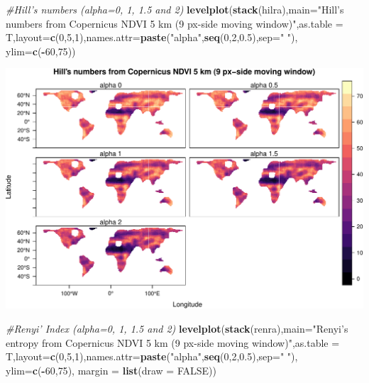 \documentclass[
]{article}
\newenvironment{Shaded}{\begin{snugshade}}{\end{snugshade}}
\newcommand{\CommentTok}[1]{\textcolor[rgb]{0.56,0.35,0.01}{\textit{#1}}}
\newcommand{\DataTypeTok}[1]{\textcolor[rgb]{0.13,0.29,0.53}{#1}}
\newcommand{\DecValTok}[1]{\textcolor[rgb]{0.00,0.00,0.81}{#1}}
\newcommand{\FloatTok}[1]{\textcolor[rgb]{0.00,0.00,0.81}{#1}}
\newcommand{\KeywordTok}[1]{\textcolor[rgb]{0.13,0.29,0.53}{\textbf{#1}}}
\newcommand{\NormalTok}[1]{#1}
\newcommand{\OperatorTok}[1]{\textcolor[rgb]{0.81,0.36,0.00}{\textbf{#1}}}
\newcommand{\OtherTok}[1]{\textcolor[rgb]{0.56,0.35,0.01}{#1}}
\newcommand{\StringTok}[1]{\textcolor[rgb]{0.31,0.60,0.02}{#1}}
\begin{document}
\begin{Shaded}
\begin{Highlighting}[]
\CommentTok{#Hill's numbers (alpha=0, 1, 1.5 and 2)}
\KeywordTok{levelplot}\NormalTok{(}\KeywordTok{stack}\NormalTok{(hilra),}\DataTypeTok{main=}\StringTok{"Hill's numbers from Copernicus NDVI 5 km (9 px-side moving window)"}\NormalTok{,}\DataTypeTok{as.table =}\NormalTok{ T,}\DataTypeTok{layout=}\KeywordTok{c}\NormalTok{(}\DecValTok{0}\NormalTok{,}\DecValTok{5}\NormalTok{,}\DecValTok{1}\NormalTok{),}\DataTypeTok{names.attr=}\KeywordTok{paste}\NormalTok{(}\StringTok{"alpha"}\NormalTok{,}\KeywordTok{seq}\NormalTok{(}\DecValTok{0}\NormalTok{,}\DecValTok{2}\NormalTok{,}\FloatTok{0.5}\NormalTok{),}\DataTypeTok{sep=}\StringTok{" "}\NormalTok{), }\DataTypeTok{ylim=}\KeywordTok{c}\NormalTok{(}\OperatorTok{-}\DecValTok{60}\NormalTok{,}\DecValTok{75}\NormalTok{))}
\end{Highlighting}
\end{Shaded}

\begin{center}\includegraphics[width=0.95\linewidth]{vignettes_rasterdiv_files/figure-latex/fig07-1} \end{center}

\begin{Shaded}
\begin{Highlighting}[]
\CommentTok{#Renyi' Index (alpha=0, 1, 1.5 and 2)}
\KeywordTok{levelplot}\NormalTok{(}\KeywordTok{stack}\NormalTok{(renra),}\DataTypeTok{main=}\StringTok{"Renyi's entropy from Copernicus NDVI 5 km (9 px-side moving window)"}\NormalTok{,}\DataTypeTok{as.table =}\NormalTok{ T,}\DataTypeTok{layout=}\KeywordTok{c}\NormalTok{(}\DecValTok{0}\NormalTok{,}\DecValTok{5}\NormalTok{,}\DecValTok{1}\NormalTok{),}\DataTypeTok{names.attr=}\KeywordTok{paste}\NormalTok{(}\StringTok{"alpha"}\NormalTok{,}\KeywordTok{seq}\NormalTok{(}\DecValTok{0}\NormalTok{,}\DecValTok{2}\NormalTok{,}\FloatTok{0.5}\NormalTok{),}\DataTypeTok{sep=}\StringTok{" "}\NormalTok{), }\DataTypeTok{ylim=}\KeywordTok{c}\NormalTok{(}\OperatorTok{-}\DecValTok{60}\NormalTok{,}\DecValTok{75}\NormalTok{), }\DataTypeTok{margin =} \KeywordTok{list}\NormalTok{(}\DataTypeTok{draw =} \OtherTok{FALSE}\NormalTok{))}
\end{Highlighting}
\end{Shaded}
\end{document}

